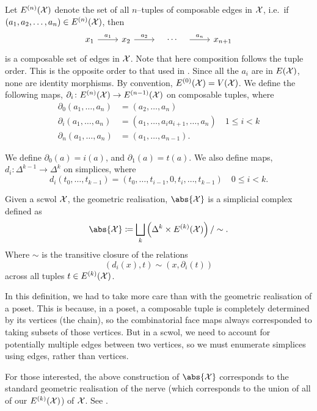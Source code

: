Let $E^{(n)}(\mathcal{X})$ denote the set of all $n$--tuples of composable edges in $\mathcal{X}$,
i.e.~if $(a_1, a_2, \ldots, a_n) \in E^{(n)}(\mathcal{X})$, then
\[
	\begin{tikzcd}
		x_1 \ar[r, "a_1"] & x_2 \ar[r, "a_2"] & {} \ar[r, phantom, "\cdots"] & {} \ar[r, "a_n"] & x_{n+1}
	\end{tikzcd}
\]
is a composable set of edges in $\mathcal{X}$.
Note that here composition follows the tuple order.
This is the opposite order to that used in \cite[Chapter 3.\textrm{\ensuremath{\calc}}]{BrHa11}.
Since all the $a_i$ are in $E(\mathcal{X})$, none are identity morphisms.
By convention, $E^{(0)}(\mathcal{X}) = V(\mathcal{X})$.
We define the following maps, $\partial_i \colon E^{(n)}(\mathcal{X}) \to E^{(n-1)}(\mathcal{X})$ on composable tuples, where
\begin{align*}
	\partial_0(a_1,\ldots,a_n) & = (a_2,\ldots,a_n)                                          \\
	\partial_i(a_1,\ldots,a_n) & = (a_1, \ldots, a_ia_{i+1}, \ldots, a_n) \quad 1 \leq i < k \\
	\partial_n(a_1,\ldots,a_n) & = (a_1, \ldots, a_{n-1})
	.\end{align*}

We define $\partial_0(a)=i(a)$, and $\partial_1(a)=t(a)$.
We also define maps, $d_i \colon \Delta^{k-1} \to \Delta^k$ on simplices, where
\[
	d_i(t_0, \ldots, t_{k-1}) = (t_0, \ldots, t_{i-1}, 0, t_i, \ldots, t_{k-1}) \quad 0 \leq i < k
	.\]

\begin{definition}
	Given a scwol $\mathcal{X}$, the geometric realisation, $\abs{\calx}$ is a simplicial complex defined as
	\[
		\abs{\calx} \coloneq \bigsqcup_k \left( \Delta^k \times E^{(k)}(\calx) \right) / \sim
		.\]
	Where $\sim$ is the transitive closure of the relations
	\[
		(d_i(x),t) \sim (x, \partial_i(t))
	\]
	across all tuples $t \in E^{(k)}(\mathcal{X})$.
	\label{def:geometric_realisation_of_scwol}
\end{definition}
In this definition, we had to take more care than with the geometric realisation of a poset.
This is because, in a poset, a composable tuple is completely determined by its vertices (the chain), so the combinatorial face maps always corresponded to taking subsets of those vertices.
But in a scwol, we need to account for potentially multiple edges between two vertices, so we must enumerate simplices using edges, rather than vertices.

For those interested, the above construction of $\abs{\calx}$ corresponds to the standard geometric realisation of the nerve (which corresponds to the union of all of our $E^{(k)}(\mathcal{X})$) of $\mathcal{X}$.
See \cite{goerss_simplicial_2009}.

